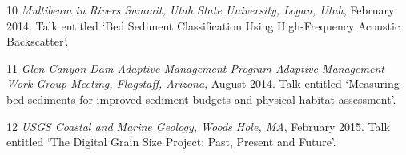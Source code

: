 \documentclass[margin,line]{resume}
\begin{document}
\begin{resume}
\begin{footnotesize}
\begin{list1}
         \item[10] {\sl Multibeam in Rivers Summit, Utah State University, Logan, Utah}, February 2014. Talk entitled `Bed Sediment Classification Using High-Frequency Acoustic Backscatter'. \\
         \item[11] {\sl Glen Canyon Dam Adaptive Management Program Adaptive Management Work Group Meeting, Flagstaff, Arizona}, August 2014. Talk entitled `Measuring bed sediments for improved sediment budgets and physical habitat assessment'. \\
         \item[12] {\sl USGS Coastal and Marine Geology, Woods Hole, MA}, February 2015. Talk entitled `The Digital Grain Size Project: Past, Present and Future'. 

 	\end{list1}
        \end{footnotesize}







\end{resume}
\end{document}
